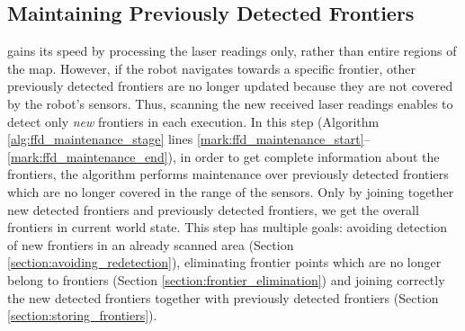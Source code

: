 	\subsection{Maintaining Previously Detected
	Frontiers}\label{section:ffd_maintaining_previously_detected_frontiers} \FFD
	gains its speed by processing the laser readings only, rather than entire regions of the map.
	However, if the robot navigates towards a specific frontier, other previously
	detected frontiers are no longer updated because they are not covered by
	the robot's sensors. Thus, scanning the new received laser readings enables
	\FFD to detect only \emph{new} frontiers in each execution. In this step
	(Algorithm \ref{alg:ffd_maintenance_stage} lines
	\ref{mark:ffd_maintenance_start}--\ref{mark:ffd_maintenance_end}), in order to
	get complete information about the frontiers, the algorithm performs
	maintenance over previously detected frontiers which are no longer covered in
	the range of the sensors. Only by joining together new detected frontiers and
	previously detected frontiers, we get the overall frontiers in current world
	state. This step has multiple goals: avoiding detection of new frontiers in
	an already scanned area (Section \ref{section:avoiding_redetection}),
	eliminating frontier points which are no longer belong to frontiers (Section
	\ref{section:frontier_elimination}) and joining correctly the new detected
	frontiers together with previously detected frontiers (Section
	\ref{section:storing_frontiers}).
		
	
	
	

